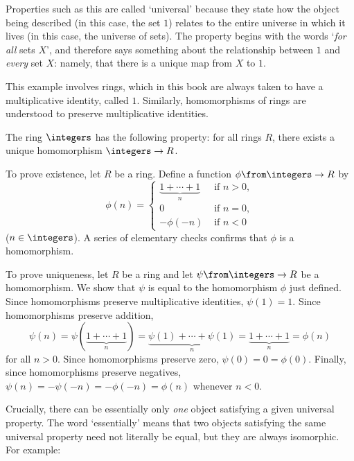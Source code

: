 Properties such as this are called `universal' because they state how the
object being described (in this case, the set $1$) relates to the entire
universe in which it lives (in this case, the universe of sets).  The
property begins with the words `\emph{for all} sets $X$', and therefore
says something about the relationship between $1$ and \emph{every} set $X$:
namely, that there is a unique map from $X$ to $1$.

\begin{iexample}        
\label{eg:univ-Z}
This example involves rings,%
%
%
which in this book are always taken to have a multiplicative identity,
called $1$.  Similarly, homomorphisms of rings are understood to preserve
multiplicative identities.

The ring $\integers$%
%
%
has the following property: for all rings $R$, there exists a unique
homomorphism $\integers \to R$.

To prove existence, let $R$ be a ring.  Define a function $\phi \from
\integers \to R$ by
\[
\phi(n)
=
\begin{cases}
\underbrace{1 + \cdots + 1}_n   &\text{ if } n > 0,     \\
0                               &\text{ if } n = 0,     \\
-\phi(-n)                       &\text{ if } n < 0
\end{cases}
\]
($n \in \integers$).  A series of elementary checks confirms that $\phi$ is
a homomorphism.

To prove uniqueness, let $R$ be a ring and let $\psi\from \integers \to R$
be a homomorphism.  We show that $\psi$ is equal to the homomorphism $\phi$
just defined.  Since homomorphisms preserve multiplicative identities,
$\psi(1) = 1$.  Since homomorphisms preserve addition,
\[
\psi(n) 
= 
\psi(\underbrace{1 + \cdots + 1}_n)
=
\underbrace{\psi(1) + \cdots + \psi(1)}_n
=
\underbrace{1 + \cdots + 1}_n
=
\phi(n)
\]
for all $n > 0$.  Since homomorphisms preserve zero, $\psi(0) = 0 = \phi(0)$.
Finally, since homomorphisms preserve negatives, $\psi(n) = -\psi(-n) =
-\phi(-n) = \phi(n)$ whenever $n < 0$.
\end{iexample}

Crucially, there can be essentially only \emph{one} object satisfying a
given universal property.  The word `essentially' means that two objects
satisfying the same universal property need not literally be equal, but
they are always isomorphic.  For example: 

